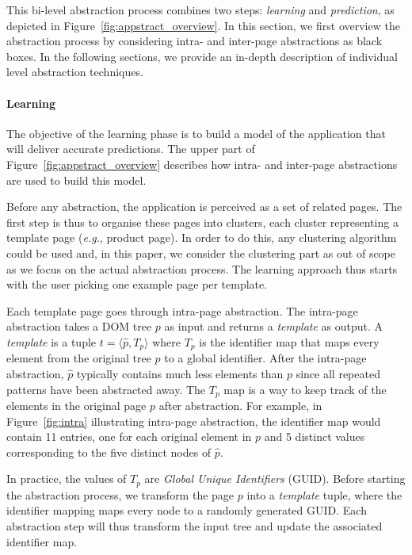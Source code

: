 \documentclass[sigconf,authordraft]{acmart}
\theoremstyle{definition}
\begin{document}
This bi-level abstraction process combines two steps: \emph{learning} and \emph{prediction}, as depicted in Figure~\ref{fig:appstract_overview}.
% 
In this section, we first overview the abstraction process by considering intra- and inter-page abstractions as black boxes. 
In the following sections, we provide an in-depth description of individual level abstraction techniques.

\paragraph{Learning}
The objective of the learning phase is to build a model of the application that will deliver accurate predictions.
The upper part of Figure~\ref{fig:appstract_overview} describes how intra- and inter-page abstractions are used to build this model.

Before any abstraction, the application is perceived as a set of related pages.
The first step is thus to organise these pages into clusters, each cluster representing a template page (\emph{e.g.}, product page).
In order to do this, any clustering algorithm could be used and, in this paper, we consider the clustering part as out of scope as we focus on the actual abstraction process.
The learning approach thus starts with the user picking one example page per template.

Each template page goes through intra-page abstraction.
The intra-page abstraction takes a DOM tree $p$ as input and returns a \textit{template} as output.
A \textit{template} is a tuple $t = \langle \hat{p}, T_p \rangle$ where $T_p$ is the identifier map that maps every element from the original tree $p$ to a global identifier. After the intra-page abstraction, $\hat{p}$ typically contains much less elements than $p$ since all repeated patterns have been abstracted away.
The $T_p$ map is a way to keep track of the elements in the original page $p$ after abstraction.
For example, in Figure~\ref{fig:intra} illustrating intra-page abstraction, the identifier map would contain 11 entries, one for each original element in $p$ and 5 distinct values corresponding to the five distinct nodes of $\hat{p}$.

In practice, the values of $T_p$ are \emph{Global Unique Identifiers} (GUID).
Before starting the abstraction process, we transform the page $p$ into a \textit{template} tuple, where the identifier mapping maps every node to a randomly generated GUID.
Each abstraction step will thus transform the input tree and update the associated identifier map.
\end{document}
